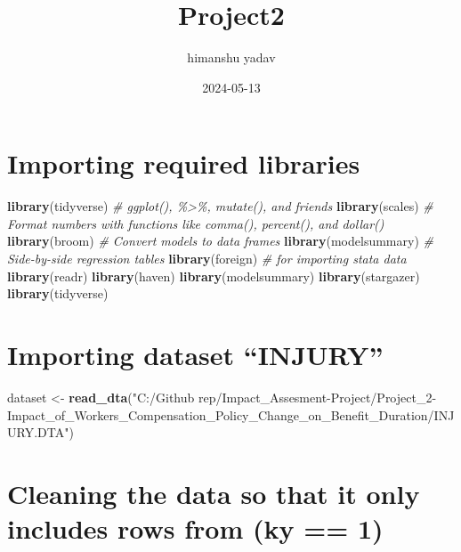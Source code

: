 \documentclass[
]{article}
\title{Project2}
\author{himanshu yadav}
\date{2024-05-13}
\newenvironment{Shaded}{\begin{snugshade}}{\end{snugshade}}
\newcommand{\CommentTok}[1]{\textcolor[rgb]{0.56,0.35,0.01}{\textit{#1}}}
\newcommand{\FunctionTok}[1]{\textcolor[rgb]{0.13,0.29,0.53}{\textbf{#1}}}
\newcommand{\NormalTok}[1]{#1}
\newcommand{\OtherTok}[1]{\textcolor[rgb]{0.56,0.35,0.01}{#1}}
\newcommand{\StringTok}[1]{\textcolor[rgb]{0.31,0.60,0.02}{#1}}
\begin{document}
\maketitle

\section{Importing required
libraries}\label{importing-required-libraries}

\begin{Shaded}
\begin{Highlighting}[]
\FunctionTok{library}\NormalTok{(tidyverse)    }\CommentTok{\# ggplot(), \%\textgreater{}\%, mutate(), and friends}
\FunctionTok{library}\NormalTok{(scales)       }\CommentTok{\# Format numbers with functions like comma(), percent(), and dollar()}
\FunctionTok{library}\NormalTok{(broom)        }\CommentTok{\# Convert models to data frames}
\FunctionTok{library}\NormalTok{(modelsummary) }\CommentTok{\# Side{-}by{-}side regression tables}
\FunctionTok{library}\NormalTok{(foreign)   }\CommentTok{\# for importing stata data}
\FunctionTok{library}\NormalTok{(readr)}
\FunctionTok{library}\NormalTok{(haven)}
\FunctionTok{library}\NormalTok{(modelsummary)}
\FunctionTok{library}\NormalTok{(stargazer)}
\FunctionTok{library}\NormalTok{(tidyverse)}
\end{Highlighting}
\end{Shaded}

\section{Importing dataset ``INJURY''}\label{importing-dataset-injury}

\begin{Shaded}
\begin{Highlighting}[]
\NormalTok{dataset }\OtherTok{\textless{}{-}} \FunctionTok{read\_dta}\NormalTok{(}\StringTok{"C:/Github rep/Impact\_Assesment{-}Project/Project\_2{-}Impact\_of\_Workers\textquotesingle{}\_Compensation\_Policy\_Change\_on\_Benefit\_Duration/INJURY.DTA"}\NormalTok{)}
\end{Highlighting}
\end{Shaded}

\section{Cleaning the data so that it only includes rows from (ky ==
1)}\label{cleaning-the-data-so-that-it-only-includes-rows-from-ky-1}
\end{document}
